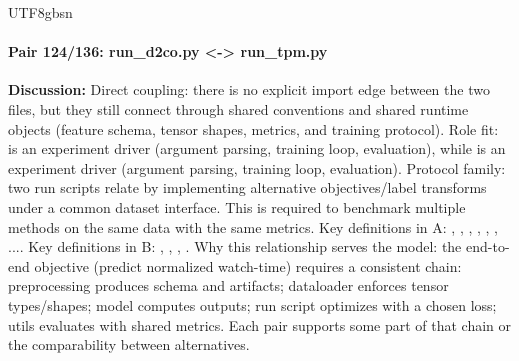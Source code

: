 \documentclass[11pt]{article}
\begin{document}
\begin{CJK*}{UTF8}{gbsn}
\paragraph{Pair 124/136: run\_d2co.py <-> run\_tpm.py}
\textbf{Discussion:} Direct coupling: there is no explicit import edge between the two files, but they still connect through shared conventions and shared runtime objects (feature schema, tensor shapes, metrics, and training protocol). Role fit: \texttt{} is an experiment driver (argument parsing, training loop, evaluation), while \texttt{} is an experiment driver (argument parsing, training loop, evaluation). Protocol family: two run scripts relate by implementing alternative objectives/label transforms under a common dataset interface. This is required to benchmark multiple methods on the same data with the same metrics. Key definitions in A: \texttt{}, \texttt{}, \texttt{}, \texttt{}, \texttt{}, \texttt{}, .... Key definitions in B: \texttt{}, \texttt{}, \texttt{}, \texttt{}. Why this relationship serves the model: the end-to-end objective (predict normalized watch-time) requires a consistent chain: preprocessing produces schema and artifacts; dataloader enforces tensor types/shapes; model computes outputs; run script optimizes with a chosen loss; utils evaluates with shared metrics. Each pair supports some part of that chain or the comparability between alternatives.


\end{CJK*}
\end{document}

